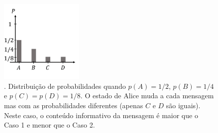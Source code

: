 \documentclass{article}
\begin{document}
\begin{figure}[h]
\centering
\includegraphics[width=4cm]{caso3.pdf}
\captionsetup{labelsep=none}
\caption{. Distribuição de probabilidades quando $p(A) = 1/2$, $p(B) = 1/4$ e $p(C) = p(D) = 1/8$. O estado de Alice muda a cada mensagem mas com as probabilidades diferentes (apenas $C$ e $D$ são iguais). Neste caso, o conteúdo informativo da mensagem é maior que o Caso 1 e menor que o Caso 2. }
\end{figure}
\end{document}
